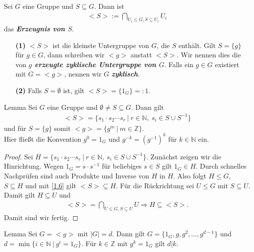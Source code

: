 \begin{df} \label{1.6}
Sei $G$ eine Gruppe und $S \subseteq G$.
Dann ist 
\begin{align*}
<S> := \bigcap \limits_{U_i \leq G, S \subseteq U_i} U_i
\end{align*}
das \textbf{\textit{Erzeugnis von $S$}}.
\begin{enumerate}
\item[\textbf{(1)}]
$<S>$ ist die kleinste Untergruppe von $G$, die $S$ enthält.
Gilt $S = \lbrace g \rbrace$ für $g \in G$, dann schreiben wir $<g>$ anstatt $<S>$.
Wir nennen dies die von \textbf{\textit{$g$ erzeugte zyklische Untergruppe von $G$}}.
Falls ein $g \in G$ existiert mit $G = < g>$, nennen wir $G$ \textbf{\textit{zyklisch}}.  
\item[\textbf{(2)}]
Falls $S = \emptyset$ ist, gilt $<S> = \lbrace 1_G \rbrace =: 1$.
\end{enumerate}
\end{df}

\begin{genericthm}{Lemma}\label{1.7}
Sei $G$ eine Gruppe und $\emptyset \neq S \subseteq G$.
Dann gilt
\begin{align*}
<S> = \lbrace s_1 \cdot s_2 \cdots s_r \ | \ r \in \mathbb{N}, \ s_i \in S \cup S^{-1} \rbrace
\end{align*}
und für $S= \lbrace g \rbrace $ somit $<g> = \lbrace g^m \ | \ m \in \mathbb{Z} \rbrace$. \\
Hier fließt die Konvention $g^0 = 1_G$ und $g^{-k} = (g^{-1})^k$ für $k \in \mathbb{N}$ ein.
\end{genericthm}

\begin{proof}
Sei $H = \lbrace s_1 \cdot s_2 \cdots s_r \ | \ r \in \mathbb{N}, \ s_i \in S \cup S^{-1} \rbrace$.
Zunächst zeigen wir die Hinrichtung.
Wegen $1_G = s \cdot s^{-1}$ für beliebiges $s \in S$ gilt $1_G \in H$.
Durch schnelles Nachprüfen sind auch Produkte und Inverse von $H$ in $H$.
Also folgt $H \leq G$, $S \subseteq H$ und mit \ref{1.6} gilt $<S> \subseteq H$.
Für die Rückrichtung sei $U \leq G$ mit $S \subseteq U$.
Damit gilt $H \subseteq U$ und 
\begin{align*}
<S> = \bigcap \limits_{U \leq G, S \subseteq U} U
\Rightarrow 
H \subseteq <S>.
\end{align*}
Damit sind wir fertig.
\end{proof} 

\begin{genericthm}{Lemma}\label{1.8}
Sei $G = <g>$ mit $|G| = d$.
Dann gilt $G = \lbrace 1_G, g ,g^2,...,g^{d-1} \rbrace$
und \\ 
$d = \min\lbrace i \in \mathbb{N} \ | \ g^i = 1_G \rbrace$.
Für $k \in \mathbb{Z}$ mit $g^k = 1_G$ gilt $d | k$.
\end{genericthm}

